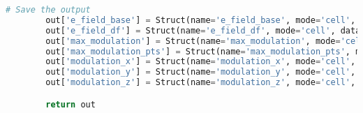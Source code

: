 \begin{lstlisting}[language=Python,caption={Class interfacing to SfePy and contains routines for the PHM and spherical model \gls{FEM} solution.},captionpos=b,label=lst:fem_solver_class]
        # Save the output
        out['e_field_base'] = Struct(name='e_field_base', mode='cell', data=e_field_base, dofs=None)
        out['e_field_df'] = Struct(name='e_field_df', mode='cell', data=e_field_df, dofs=None)
        out['max_modulation'] = Struct(name='max_modulation', mode='cell', data=modulation_cells, dofs=None)
        out['max_modulation_pts'] = Struct(name='max_modulation_pts', mode='vertex', data=modulation_points, dofs=None)
        out['modulation_x'] = Struct(name='modulation_x', mode='cell', data=modulation_x, dofs=None)
        out['modulation_y'] = Struct(name='modulation_y', mode='cell', data=modulation_y, dofs=None)
        out['modulation_z'] = Struct(name='modulation_z', mode='cell', data=modulation_z, dofs=None)

        return out
\end{lstlisting}

